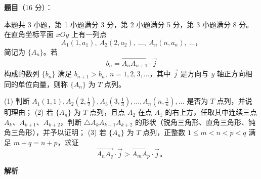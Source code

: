 \begin{answer}

\textbf{题目}（16 分）：

本题共 3 小题，第 1 小题满分 3 分，第 2 小题满分 5 分，第 3 小题满分 8 分。在直角坐标平面 \(xOy\) 上有一列点
\nopagebreak[4]
\[
A_1(1,a_1),\ A_2(2,a_2),\ \ldots,\ A_n(n,a_n),\ \ldots\text{，}
\]
简记为 \(\{A_n\}\)。若
\nopagebreak[4]
\[
b_n=\overrightarrow{A_nA_{n+1}}\cdot\vec j
\]
构成的数列 \(\{b_n\}\) 满足 \(b_{n+1}>b_n,\ n=1,2,3,\ldots\)，其中 \(\vec j\) 是方向与 \(y\) 轴正方向相同的单位向量，则称 \(\{A_n\}\) 为 \(T\) 点列。

(1) 判断 \(A_1(1,1), A_2(2,\frac12), A_3(3,\frac13),\ldots,A_n(n,\frac1n),\ldots\) 是否为 \(T\) 点列，并说明理由；
(2) 若 \(\{A_n\}\) 为 \(T\) 点列，且点 \(A_2\) 在点 \(A_1\) 的右上方，任取其中连续三点 \(A_k\text{、}A_{k+1}\text{、}A_{k+2}\)，判断 \(\triangle A_kA_{k+1}A_{k+2}\) 的形状（锐角三角形、直角三角形、钝角三角形），并予以证明；
(3) 若 \(\{A_n\}\) 为 \(T\) 点列，正整数 \(1\le m<n<p<q\) 满足 \(m+q=n+p\)，求证
\nopagebreak[4]
\[
   \overrightarrow{A_nA_q}\cdot\vec j>\overrightarrow{A_mA_p}\cdot\vec j\text{。}
\]

\textbf{解析}





\end{answer}
